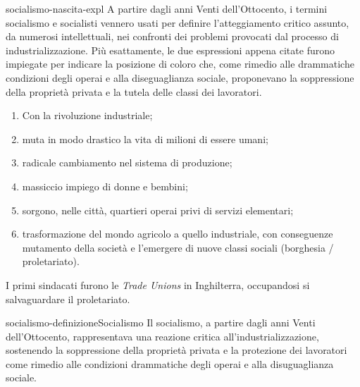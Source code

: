 \documentclass[preview]{standalone}
\begin{document}
\begin{snippet}{socialismo-nascita-expl}
    A partire dagli anni Venti dell'Ottocento, i termini socialismo e socialisti vennero usati per
    definire l'atteggiamento critico assunto, da numerosi intellettuali, nei confronti dei
    problemi provocati dal processo di industrializzazione. Più esattamente, le due espressioni
    appena citate furono impiegate per indicare la posizione di coloro che, come rimedio alle
    drammatiche condizioni degli operai e alla diseguaglianza sociale, proponevano la
    soppressione della proprietà privata e la tutela delle classi dei lavoratori.

    \begin{enumerate}
        \item Con la rivoluzione industriale;
        \item muta in modo drastico la vita di milioni di essere umani;
        \item radicale cambiamento nel sistema di produzione;
        \item massiccio impiego di donne e bembini;
        \item sorgono, nelle città, quartieri operai privi di servizi elementari;
        \item trasformazione del mondo agricolo a quello industriale, con conseguenze mutamento della società e l'emergere di nuove classi sociali (borghesia / proletariato).
    \end{enumerate}
    
    I primi sindacati furono le \textit{Trade Unions} in Inghilterra, occupandosi si salvaguardare il proletariato.
\end{snippet}

\begin{snippetdefinition}{socialismo-definizione}{Socialismo}
    Il socialismo, a partire dagli anni Venti dell'Ottocento, rappresentava una reazione critica all'industrializzazione, sostenendo la soppressione della proprietà privata e la protezione dei lavoratori come rimedio alle condizioni drammatiche degli operai e alla disuguaglianza sociale.
\end{snippetdefinition}
\end{document}
